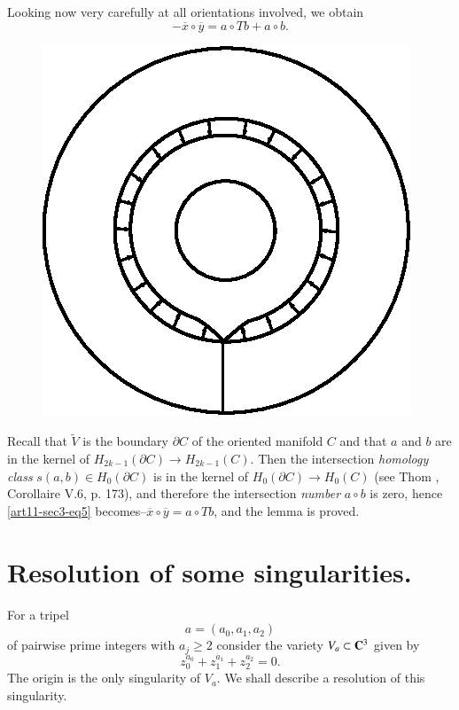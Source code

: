 Looking now very carefully at all orientations involved, we obtain 
\begin{equation*}
-\overline{x}\circ \overline{y}=a\circ Tb+a\circ b.\tag{5}\label{art11-sec3-eq5}
\end{equation*}
\begin{figure}[H]
\centering
\includegraphics{src/chap11/fig8.eps}
\end{figure}

Recall that $\widetilde{V}$ is the boundary $\partial C$ of the oriented manifold $C$ and that $a$ and $b$ are in the kernel of $H_{2k-1}(\partial C)\to H_{2k-1}(C)$. Then the intersection {\em homology class} $s(a,b)\in H_{0}(\partial C)$ is in the kernel of $H_{0}(\partial C)\to H_{0}(C)$ (see Thom \cite{art11-key8}, Corollaire V.6, p. 173), and therefore the intersection {\em number} $a\circ b$ is zero, hence \eqref{art11-sec3-eq5} becomes--$\overline{x}\circ \overline{y}=a\circ Tb$, and the lemma is proved.

\section{Resolution of some singularities.}\label{art11-sec4}

For a tripel 
$$
a=(a_{0},a_{1},a_{2})
$$ 
of pairwise prime integers with $a_{j}\geq 2$ consider the variety $V_{a}\subset \mathbf{C}^{3}$ given by
\begin{equation*}
z^{a_{0}}_{0}+z^{a_{1}}_{1}+z^{a_{2}}_{2}=0.\tag{1}\label{art11-sec4-eq1}
\end{equation*}\pageoriginale
The origin is the only singularity of $V_{a}$. We shall describe a resolution of this singularity.

